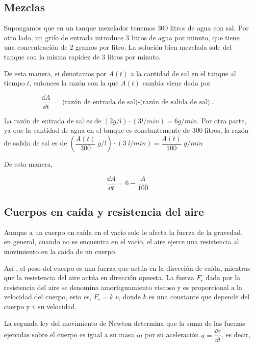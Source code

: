 \subsection{Mezclas} 
   
   Supongamos que en un tanque mezclador tenemos $300$ litros de agua con sal. Por otro lado, un grifo de entrada introduce $3$ litros de agua por minuto, que tiene una concentración de $2$ gramos por litro. La solución bien mezclada sale del tanque con la misma rapidez de $3$ litros por minuto. 
   
De esta manera, si denotamos por $A(t)$ a la cantidad de sal en el tanque al tiempo $t$, entonces la razón con la que $A(t)$ cambia viene dada por 
   
   \begin{equation*}
   	\dfrac {\dd A}{\dd t}= \text{ (razón de entrada de sal)-(razón de salida de sal)}\; .
   \end{equation*}
   
La razón de entrada de sal es de $(2g/l) \cdot (3l/min) = 6g/min$. Por otra parte, ya que la cantidad de agua en el tanque es constantemente de $300$ litros, la 
razón de salida de sal es de $\displaystyle \left(\dfrac {A(t)}{300}\; g/l \right) \cdot \left( 3 \; l/min \right)=\dfrac {A(t)}{100}\; g/min$
   
De esta manera, 
   
   \begin{equation*}
   	\dfrac {\dd A}{\dd t}=6-\dfrac {A}{100}
   \end{equation*}
   

\subsection{Cuerpos en caída y resistencia del aire}
   
Aunque a un cuerpo en caída en el vacío solo le afecta la fuerza de la gravedad, en general, cuando no se encuentra en el vacío, el aire ejerce una resistencia al movimiento en la caída de un cuerpo. 
   
   Así , el peso del cuerpo es una fuerza que actúa en la dirección de  caída, mientras que la resistencia del aire actúa en dirección opuesta. La fuerza $F_r$ dada por la resistencia del aire se denomina amortiguamiento viscoso y es proporcional a la velocidad del cuerpo, esto es, $F_r = k\; v$, donde $k$ es una constante que depende del cuerpo y $v$ su velocidad. 
   
	La segunda ley del movimiento de Newton determina que la suma de las fuerzas ejercidas sobre el cuerpo es igual a su masa $m$ por su aceleración $a=\dfrac {\dd v}{\dd t}$, es decir, 
   
